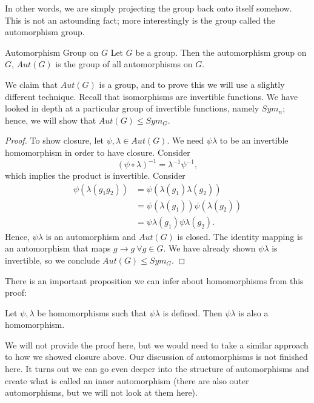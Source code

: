 In other words, we are simply projecting the group back onto itself somehow.
This is not an astounding fact; more interestingly is the group called the automorphism group.

\begin{definition}{Automorphism Group on $G$}
    Let $G$ be a group. Then the automorphism group on $G$, $Aut(G)$ is the group of all automorphisms on $G$.
\end{definition}

We claim that $Aut(G)$ is a group, and to prove this we will use a slightly different technique.
Recall that isomorphisms are invertible functions.
We have looked in depth at a particular group of invertible functions, namely $Sym_{n}$; hence, we will show that $Aut(G)\leq Sym_{G}$.

\begin{proof}
    To show closure, let $\psi,\lambda\in Aut(G)$.
    We need $\psi\lambda$ to be an invertible homomorphism in order to have closure.
    Consider
    \[
        (\psi\circ\lambda)^{-1}=\lambda^{-1}\psi^{-1},
    \]
    which implies the product is invertible.
    Consider
    \begin{align*}
        \psi(\lambda(g_{1}g_{2})) &= \psi(\lambda(g_{1})\lambda(g_{2}))\\
        &= \psi(\lambda(g_{1}))\psi(\lambda(g_{2}))\\
        &= \psi\lambda(g_{1})\psi\lambda(g_{2}).
    \end{align*}
    Hence, $\psi\lambda$ is an automorphism and $Aut(G)$ is closed.
    The identity mapping is an automorphism that maps $g\to g\ \forall g \in G$.
    We have already shown $\psi\lambda$ is invertible, so we conclude $Aut(G)\leq Sym_{G}$.
\end{proof}

There is an important proposition we can infer about homomorphisms from this proof:

\begin{theorem}{}
    Let $\psi,\lambda$ be homomorphisms such that $\psi\lambda$ is defined. Then $\psi\lambda$ is also a homomorphism.
\end{theorem}

We will not provide the proof here, but we would need to take a similar approach to how we showed closure above.
Our discussion of automorphisms is not finished here.
It turns out we can go even deeper into the structure of automorphisms and create what is called an inner automorphism (there are also outer automorphisms, but we will not look at them here).

